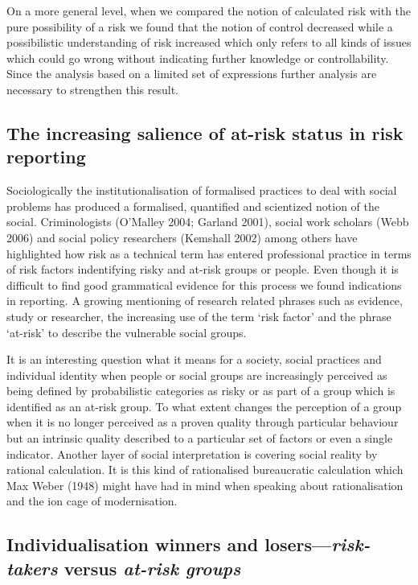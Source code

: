 On a more general level, when we compared the notion of calculated risk with the pure possibility of a risk we found that the notion of control decreased while a possibilistic understanding of risk increased which only refers to all kinds of issues which could go wrong without indicating further knowledge or controllability. Since the analysis based on a limited set of expressions further analysis are necessary to strengthen this result. 

\subsection*{The increasing salience of at-risk status in risk reporting}

Sociologically the institutionalisation of formalised practices to deal with social problems has produced a formalised, quantified and scientized notion of the social. Criminologists (O'Malley 2004; Garland 2001), social work scholars (Webb 2006) and social policy researchers (Kemshall 2002) among others have highlighted how risk as a technical term has entered professional practice in terms of risk factors indentifying risky and at-risk groups or people. Even though it is difficult to find good grammatical evidence for this process we found indications in reporting. A growing mentioning of research related phrases such as evidence, study or researcher, the increasing use of the term `risk factor' and the phrase `at-risk' to describe the vulnerable social groups.

It is an interesting question what it means for a society, social practices and individual identity when people or social groups are increasingly perceived as being defined by probabilistic categories as risky or as part of a group which is identified as an at-risk group. To what extent changes the perception of a group when it is no longer perceived as a proven quality through particular behaviour but an intrinsic quality described to a particular set of factors or even a single indicator. Another layer of social interpretation is covering social reality by rational calculation. It is this kind of rationalised bureaucratic calculation which Max Weber (1948) might have had in mind when speaking about rationalisation and the ion cage of modernisation.

\subsection*{Individualisation winners and losers---\emph{risk-takers} versus \emph{at-risk groups}}

